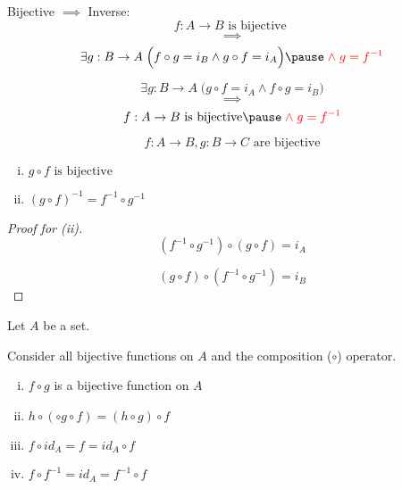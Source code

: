 \begin{frame}{}
  \begin{alertblock}{Bijective $\implies$ Inverse:}
    \[
      f: A \to B \text{ is bijective }
    \]
    \[ 
      \implies 
    \]
    \[
      \exists g: B \to A\; \Big( f \circ g = i_B \land g \circ f = i_A \Big) \pause \red{\;\land\; g = f^{-1}}
    \]
  \end{alertblock}

  \pause
  \vspace{0.50cm}
  \begin{theorem}
    \[
      \exists g: B \to A\; \Big( g \circ f = i_A \land f \circ g = i_B \Big) 
    \]
    \[ 
      \implies 
    \]
    \[
      f: A \to B \text{ is bijective} \pause \red{\;\land\; g = f^{-1}}
    \]
  \end{theorem}
\end{frame}

\begin{frame}{}
  \begin{theorem}
    \[
      f: A \to B, g: B \to C \text{ are bijective}
    \]

    \begin{enumerate}[(i)]
      \item $g \circ f \text{ is bijective}$
      \item $(g \circ f)^{-1} = f^{-1} \circ g^{-1}$
    \end{enumerate}
  \end{theorem}

  \begin{proof}[Proof for (ii)]
    \[
      (f^{-1} \circ g^{-1}) \circ (g \circ f) = i_A
    \]

    \[
      (g \circ f) \circ (f^{-1} \circ g^{-1}) = i_B
    \]
  \end{proof}
\end{frame}

\begin{frame}{}
  \begin{definition}
    Let $A$ be a set.

    Consider all bijective functions on $A$ and the composition ($\circ$) operator.

    \begin{enumerate}[(i)]
      \item $f \circ g$ is a bijective function on $A$
      \item $h \circ (\circ g \circ f) = (h \circ g) \circ f$
      \item $f \circ id_A = f = id_A \circ f$
      \item $f \circ f^{-1} = id_A = f^{-1} \circ f$
    \end{enumerate}
  \end{definition}

  \pause
  \vspace{0.50cm}
\end{frame}
